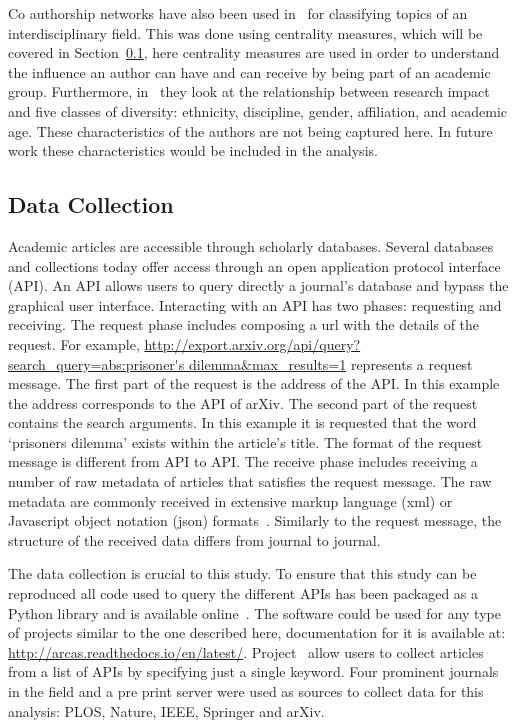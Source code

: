\documentclass{article}
\theoremstyle{definition}
\begin{document}
Co authorship networks have also been used in~\cite{youngblood2018} for
classifying topics of an interdisciplinary field. This was done using centrality
measures, which will be covered in Section~\ref{section:data_collection}, here
centrality measures are used in order to understand the influence an author can
have and can receive by being part of an academic group. Furthermore,
in~\cite{alshebli2018} they look at the relationship between research impact and
five classes of diversity: ethnicity, discipline, gender, affiliation, and
academic age. These characteristics of the authors are not being captured here.
In future work these characteristics would be included in the analysis.

\subsection{Data Collection}\label{section:data_collection}

Academic articles are accessible through scholarly databases. Several databases
and collections today offer access through an open application protocol
interface (API). An API allows users to query directly a journal's database and
bypass the graphical user interface. Interacting with an API has two phases:
requesting and receiving. The request phase includes composing a url with the
details of the request. For example,
\url{http://export.arxiv.org/api/query?search_query=abs:prisoner's
dilemma&max_results=1} represents a request message. The first part of the
request is the address of the API. In this example the address corresponds to
the API of arXiv. The second part of the request contains the search arguments.
In this example it is requested that the word `prisoners dilemma' exists within
the article's title. The format of the request message is different from API to
API. The receive phase includes receiving a number of raw metadata of articles
that satisfies the request message. The raw metadata are commonly received in
extensive markup language (xml) or Javascript object notation (json)
formats~\cite{nurseitov2009}. Similarly to the request message, the structure of
the received data differs from journal
to journal.

The data collection is crucial to this study. To ensure that this study can be
reproduced all code used to query the different APIs has been packaged as a
Python library and is available online~\cite{nikoleta_2017}. The software could
be used for any type of projects similar to the one described here,
documentation for it is available at:
\url{http://arcas.readthedocs.io/en/latest/}. Project~\cite{nikoleta_2017} allow
users to collect articles from a list of APIs by specifying just a single
keyword. Four prominent journals in the field and a pre print server were used
as sources to collect data for this analysis: PLOS, Nature, IEEE, Springer and
arXiv.
\end{document}

